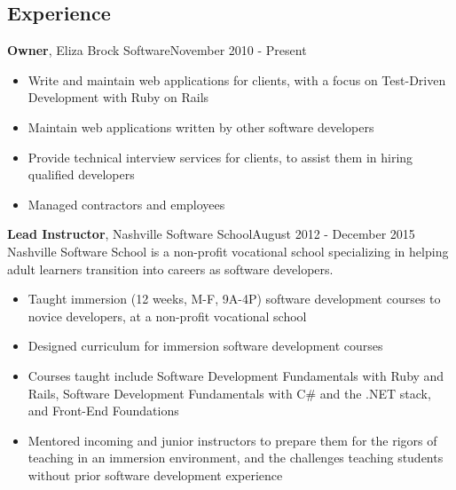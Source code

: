 \documentclass[line, margin, 10pt]{res}
\begin{document}
\renewcommand{\namefont}{ \LARGE \bf }

\address{eliza@elizabrocksoftware.com}
\address{elizabrock.com}

\begin{resume}
\section{Experience}


{\bf Owner}, Eliza Brock Software\hfill November 2010 - Present
\begin{itemize} \itemsep -2pt  %
  \item Write and maintain web applications for clients, with a focus on Test-Driven Development with Ruby on Rails
  \item Maintain web applications written by other software developers
  \item Provide technical interview services for clients, to assist them in hiring qualified developers
  \item Managed contractors and employees
\end{itemize}

{\bf Lead Instructor}, Nashville Software School\hfill August 2012 - December 2015\\
Nashville Software School is a non-profit vocational school specializing in helping adult learners transition into careers as software developers.
\begin{itemize} \itemsep -2pt  %
  \item Taught immersion (12 weeks, M-F, 9A-4P) software development courses to novice developers, at a non-profit vocational school
  \item Designed curriculum for immersion software development courses
  \item Courses taught include Software Development Fundamentals with Ruby and Rails, Software Development Fundamentals with C\# and the .NET stack, and Front-End Foundations
  \item Mentored incoming and junior instructors to prepare them for the rigors of teaching in an immersion environment, and the challenges teaching students without prior software development experience
\end{itemize}


\end{resume}
\end{document}
